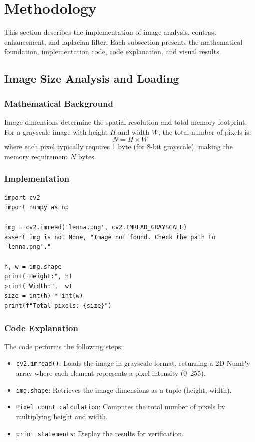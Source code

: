 \documentclass[a4paper,12pt]{article}
\begin{document}
\section{Methodology}
This section describes the implementation of image analysis, contrast enhancement, and laplacian filter. Each subsection presents the mathematical foundation, implementation code, code explanation, and visual results.

\subsection{Image Size Analysis and Loading}
\subsubsection{Mathematical Background}
Image dimensions determine the spatial resolution and total memory footprint. For a grayscale image with height $H$ and width $W$, the total number of pixels is:
\[N = H \times W\]
where each pixel typically requires 1 byte (for 8-bit grayscale), making the memory requirement $N$ bytes.

\subsubsection{Implementation}
\begin{lstlisting}[style=pystyle, caption={Loading and analyzing image dimensions}, label={lst:size}]
import cv2
import numpy as np

img = cv2.imread('lenna.png', cv2.IMREAD_GRAYSCALE)
assert img is not None, "Image not found. Check the path to 'lenna.png'."

h, w = img.shape
print("Height:", h)
print("Width:",  w)
size = int(h) * int(w)
print(f"Total pixels: {size}")
\end{lstlisting}

\subsubsection{Code Explanation}
The code performs the following steps:
\begin{itemize}
    \item \texttt{cv2.imread()}: Loads the image in grayscale format, returning a 2D NumPy array where each element represents a pixel intensity (0--255).
    \item \texttt{img.shape}: Retrieves the image dimensions as a tuple (height, width).
    \item \texttt{Pixel count calculation}: Computes the total number of pixels by multiplying height and width.
    \item \texttt{print statements}: Display the results for verification.
\end{itemize}
\end{document}
